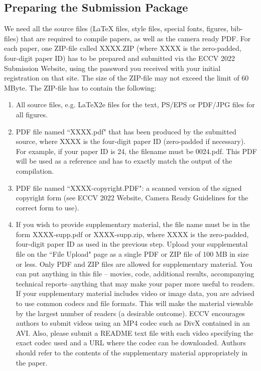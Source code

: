 \documentclass[runningheads]{llncs}
\begin{document}
\subsection{Preparing the Submission Package}
We need all the source files (LaTeX files, style files, special fonts, figures, bib-files) that are required to compile papers, as well as the camera ready PDF. For each paper, one ZIP-file called XXXX.ZIP (where XXXX is the zero-padded, four-digit paper ID) has to be prepared and submitted via the ECCV 2022 Submission Website, using the password you received with your initial registration on that site. The size of the ZIP-file may not exceed the limit of 60 MByte. The ZIP-file has to contain the following:
  \begin{enumerate}
 \item  All source files, e.g. LaTeX2e files for the text, PS/EPS or PDF/JPG files for all figures.
 \item PDF file named ``XXXX.pdf" that has been produced by the submitted source, where XXXX is the four-digit paper ID (zero-padded if necessary). For example, if your paper ID is 24, the filename must be 0024.pdf. This PDF will be used as a reference and has to exactly match the output of the compilation.
 \item PDF file named ``XXXX-copyright.PDF": a scanned version of the signed copyright form (see ECCV 2022 Website, Camera Ready Guidelines for the correct form to use). 
 \item If you wish to provide supplementary material, the file name must be in the form XXXX-supp.pdf or XXXX-supp.zip, where XXXX is the zero-padded, four-digit paper ID as used in the previous step. Upload your supplemental file on the ``File Upload" page as a single PDF or ZIP file of 100 MB in size or less. Only PDF and ZIP files are allowed for supplementary material. You can put anything in this file – movies, code, additional results, accompanying technical reports–anything that may make your paper more useful to readers.  If your supplementary material includes video or image data, you are advised to use common codecs and file formats.  This will make the material viewable by the largest number of readers (a desirable outcome). ECCV encourages authors to submit videos using an MP4 codec such as DivX contained in an AVI. Also, please submit a README text file with each video specifying the exact codec used and a URL where the codec can be downloaded. Authors should refer to the contents of the supplementary material appropriately in the paper.
 \end{enumerate}
\end{document}
